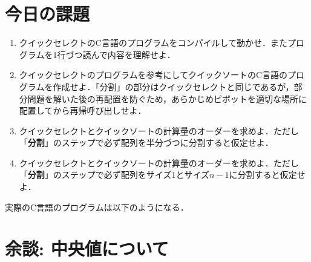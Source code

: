 \documentclass[a4paper,twoside,onecolumn,openany,article]{memoir}
\theoremstyle{remark}
\begin{document}
\section{今日の課題}
\begin{enumerate}
\item クイックセレクトのC言語のプログラムをコンパイルして動かせ．またプログラムを1行づつ読んで内容を理解せよ．
\item クイックセレクトのプログラムを参考にしてクイックソートのC言語のプログラムを作成せよ．「分割」の部分はクイックセレクトと同じであるが，部分問題を解いた後の再配置を防ぐため，あらかじめピボットを適切な場所に配置してから再帰呼び出しせよ．
\item クイックセレクトとクイックソートの計算量のオーダーを求めよ．ただし「\textbf{分割}」のステップで必ず配列を半分づつに分割すると仮定せよ．
\item クイックセレクトとクイックソートの計算量のオーダーを求めよ．ただし「\textbf{分割}」のステップで必ず配列をサイズ1とサイズ$n-1$に分割すると仮定せよ．
\end{enumerate}
実際のC言語のプログラムは以下のようになる．


\section*{余談: 中央値について}
\end{document}
